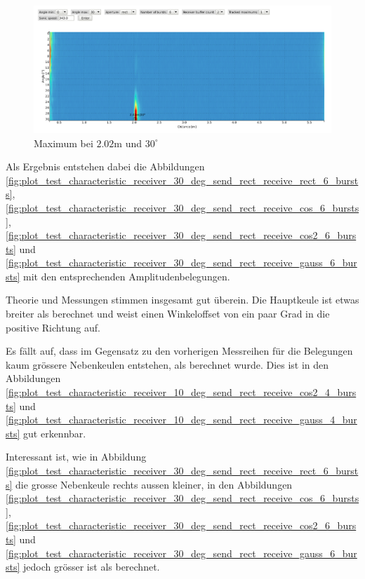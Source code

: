 \begin{figure}[htb]
\includegraphics[width=\textwidth]{graphics/image_test_characteristic_receiver_30_deg_send.png}
\caption{Maximum bei $2.02 \mathrm{m}$ und $30^{\circ}$} %
\label{fig:image_test_characteristic_receiver_30_deg_send}
\end{figure}
%

Als Ergebnis entstehen dabei die Abbildungen \ref{fig:plot_test_characteristic_receiver_30_deg_send_rect_receive_rect_6_bursts}, \ref{fig:plot_test_characteristic_receiver_30_deg_send_rect_receive_cos_6_bursts}, \ref{fig:plot_test_characteristic_receiver_30_deg_send_rect_receive_cos2_6_bursts} und \ref{fig:plot_test_characteristic_receiver_30_deg_send_rect_receive_gauss_6_bursts} mit den entsprechenden Amplitudenbelegungen.

Theorie und Messungen stimmen insgesamt gut überein. Die Hauptkeule ist etwas breiter als berechnet und weist einen Winkeloffset von ein paar Grad in die positive Richtung auf.

Es fällt auf, dass im Gegensatz zu den vorherigen Messreihen für die Belegungen kaum grössere Nebenkeulen entstehen, als berechnet wurde. Dies ist in den Abbildungen \ref{fig:plot_test_characteristic_receiver_10_deg_send_rect_receive_cos2_4_bursts} und \ref{fig:plot_test_characteristic_receiver_10_deg_send_rect_receive_gauss_4_bursts} gut erkennbar.

Interessant ist, wie in Abbildung \ref{fig:plot_test_characteristic_receiver_30_deg_send_rect_receive_rect_6_bursts} die grosse Nebenkeule rechts aussen kleiner, in den Abbildungen \ref{fig:plot_test_characteristic_receiver_30_deg_send_rect_receive_cos_6_bursts}, \ref{fig:plot_test_characteristic_receiver_30_deg_send_rect_receive_cos2_6_bursts} und \ref{fig:plot_test_characteristic_receiver_30_deg_send_rect_receive_gauss_6_bursts} jedoch grösser ist als berechnet.

